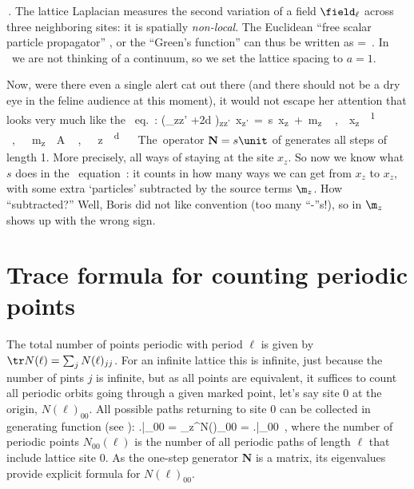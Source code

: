 \,.
The lattice Laplacian measures the second variation of a field
$\field_\ell$ across three neighboring sites: it is spatially
\emph{non-local}.
The Euclidean ``free scalar particle propagator'' , or the
``Green's function'' can thus be written as
\beq
\Delta =  
\,.
\label{(5.5a)}
\eeq
In  \catlatt\ we are not thinking of a continuum, so we set
the lattice spacing to $a=1$.

Now, were there even a single alert cat out there (and there should not be a
dry eye in the feline audience at this moment), it would not escape her
attention that  looks very much like the \catlatt\
eq.~:
\beq
(\Box_{zz'} +2d \unit)_{zz'} x_{z'} =  s x_{z} + \m_z
    \,, \qquad
  x_{z} \in  {}^{1}
    \,, \;\;
  m_{z} \in \A
    \,, \;\;
  z\in \integers^{d}
\,.
The operator $\mathbf{N} = s\unit$ of  generates all steps of
length 1. More precisely, all ways of staying at the site $x_{z}$. So now we
know what $s$ does in the \catlatt\ equation~\refeq{LinearConnPC}: it counts
in how many ways we can get from $x_{z}$ to $x_{z}$, with some extra
`particles' subtracted by the source terms $\m_z$. How ``subtracted?'' Well,
Boris did not like \PV\rf{PerViv} convention (too many
``-''s!), so in  $\m_z$ shows up with the wrong sign.

\section{Trace formula for counting periodic points}
\label{sect:Helmoltz}

The total number of points periodic with period $\ell$ is
given by $\tr N(\ell) = \sum_j N(\ell)_{jj}$. For an infinite lattice
this is infinite, just because the number of pints $j$ is infinite,
but as all points are equivalent, it suffices
to count all periodic orbits going through a given marked point,
let's say site $0$ at the origin, $N(\ell)_{00}$.
All possible paths returning to site $0$ can be
collected in generating function (see ):
\beq
\left.\Delta\right|_{00} = \sum_\ell z^\ell N(\ell)_{00}
  = \left.\right|_{00}	
\,,
where the number of periodic points $N_{00}(\ell)$ is the number of all
periodic paths of length $\ell$ that include lattice site $0$.
As the one-step generator $\mathbf{N}$ is a matrix, its
eigenvalues provide explicit formula for $N(\ell)_{00}$.


